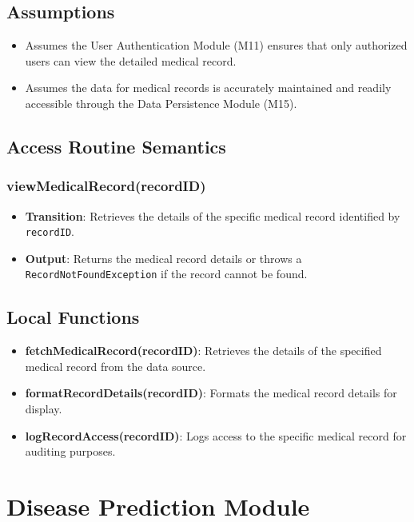 \documentclass[12pt, titlepage]{article}
\begin{document}
\subsection{Assumptions}
\begin{itemize}
    \item Assumes the User Authentication Module (M11) ensures that only authorized users can view the detailed medical record.
    \item Assumes the data for medical records is accurately maintained and readily accessible through the Data Persistence Module (M15).
\end{itemize}


\subsection{Access Routine Semantics}
\subsubsection{viewMedicalRecord(recordID)}
\begin{itemize}
    \item \textbf{Transition}: Retrieves the details of the specific medical record identified by \texttt{recordID}.
    \item \textbf{Output}: Returns the medical record details or throws a \texttt{RecordNotFoundException} if the record cannot be found.
\end{itemize}

\subsection{Local Functions}
\begin{itemize}
\item \textbf{fetchMedicalRecord(recordID)}: Retrieves the details of the specified medical record from the data source.
\item \textbf{formatRecordDetails(recordID)}: Formats the medical record details for display.
\item \textbf{logRecordAccess(recordID)}: Logs access to the specific medical record for auditing purposes.
\end{itemize}
\section{Disease Prediction Module}
\label{Disease Prediction Module}
\end{document}
